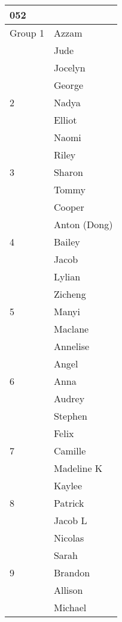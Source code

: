 \documentclass{standalone}
\begin{document}
	\begin{tabular}{l|l}
	052&\\	\hline Group 1
	&Azzam \\ 
	&Jude \\ 
	&Jocelyn \\ 
	&George \\
	\hline 2
	&Nadya \\ 
	&Elliot \\ 
	&Naomi \\ 
	&Riley \\ 
	\hline 3
	&Sharon \\ 
	&Tommy \\ 
	&Cooper \\ 
	&Anton (Dong) \\ 
	\hline 4
	&Bailey \\ 
	&Jacob \\ 
	&Lylian \\ 
	&Zicheng \\ 
	\hline 5
	&Manyi \\ 
	&Maclane \\ 
	&Annelise \\ 
	&Angel \\ 
	\hline 6
	&Anna \\ 
	&Audrey \\
	&Stephen \\ 
	&Felix \\ 
	\hline 7
	&Camille \\ 
	&Madeline K \\ 
	&Kaylee \\ 
	\hline 8 
	&Patrick \\ 
	&Jacob L \\ 
	&Nicolas \\ 
	&Sarah \\ 
	\hline 9 
	&Brandon \\ 
	&Allison \\ 
	&Michael
\end{tabular}
\end{document}

